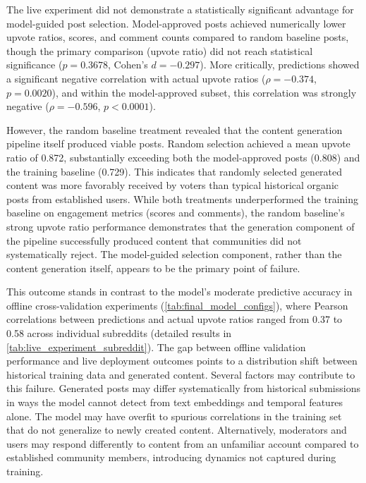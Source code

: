 The live experiment did not demonstrate a statistically significant advantage for model-guided post selection. Model-approved posts achieved numerically lower upvote ratios, scores, and comment counts compared to random baseline posts, though the primary comparison (upvote ratio) did not reach statistical significance ($p = 0.3678$, Cohen's $d = -0.297$). More critically, predictions showed a significant negative correlation with actual upvote ratios ($\rho = -0.374$, $p = 0.0020$), and within the model-approved subset, this correlation was strongly negative ($\rho = -0.596$, $p < 0.0001$).

However, the random baseline treatment revealed that the content generation pipeline itself produced viable posts. Random selection achieved a mean upvote ratio of 0.872, substantially exceeding both the model-approved posts (0.808) and the training baseline (0.729). This indicates that randomly selected generated content was more favorably received by voters than typical historical organic posts from established users. While both treatments underperformed the training baseline on engagement metrics (scores and comments), the random baseline's strong upvote ratio performance demonstrates that the generation component of the pipeline successfully produced content that communities did not systematically reject. The model-guided selection component, rather than the content generation itself, appears to be the primary point of failure.

This outcome stands in contrast to the model's moderate predictive accuracy in offline cross-validation experiments (\autoref{tab:final_model_configs}), where Pearson correlations between predictions and actual upvote ratios ranged from 0.37 to 0.58 across individual subreddits (detailed results in \autoref{tab:live_experiment_subreddit}). The gap between offline validation performance and live deployment outcomes points to a distribution shift between historical training data and generated content. Several factors may contribute to this failure. Generated posts may differ systematically from historical submissions in ways the model cannot detect from text embeddings and temporal features alone. The model may have overfit to spurious correlations in the training set that do not generalize to newly created content. Alternatively, moderators and users may respond differently to content from an unfamiliar account compared to established community members, introducing dynamics not captured during training.

